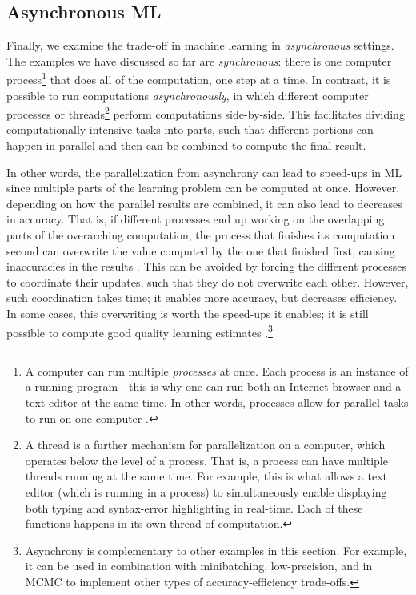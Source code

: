\documentclass[sigplan,screen]{acmart}
\begin{document}
\subsection{Asynchronous ML} \label{sec:async}
Finally, we examine the trade-off in machine learning in \emph{asynchronous} settings. The examples we have discussed so far are \emph{synchronous}: there is one computer process\footnote{A computer can run multiple \emph{processes} at once. Each process is an instance of a running program---this is why one can run both an Internet browser and a text editor at the same time. In other words, processes allow for parallel tasks to run on one computer \cite{ArpaciDusseau2018os}.} that does all of the computation, one step at a time. In contrast, it is possible to run computations \emph{asynchronously}, in which different computer processes or threads\footnote{A thread is a further mechanism for parallelization on a computer, which operates below the level of a process. That is, a process can have multiple threads running at the same time. For example, this is what allows a text editor (which is running in a process) to simultaneously enable displaying both typing and syntax-error highlighting in real-time. Each of these functions happens in its own thread of computation.} perform computations side-by-side. This facilitates dividing computationally intensive tasks into parts, such that different portions can happen in parallel and then can be combined to compute the final result.

In other words, the parallelization from asynchrony can lead to speed-ups in ML since multiple parts of the learning problem can be computed at once. However, depending on how the parallel results are combined, it can also lead to decreases in accuracy. That is, if different processes end up working on the overlapping parts of the overarching computation, the process that finishes its computation second can overwrite the value computed by the one that finished first, causing inaccuracies in the results \cite{desa2017async, alistarh2018convergence, lian2017asynchronous, Niu2011hogwild}. This can be avoided by forcing the different processes to coordinate their updates, such that they do not overwrite each other. However, such coordination takes time; it enables more accuracy, but decreases efficiency. In some cases, this overwriting is worth the speed-ups it enables; it is still possible to compute good quality learning estimates \cite{desa2016gibbs, daskalakis2018gibbs}.\footnote{Asynchrony is complementary to other examples in this section. For example, it can be used in combination with minibatching, low-precision, and in MCMC to implement other types of accuracy-efficiency trade-offs.}
\\
\end{document}
